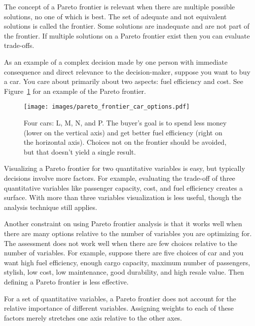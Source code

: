 The concept of a Pareto frontier is relevant when there are multiple possible solutions, no one of which is best. The set of adequate and not equivalent solutions is called the frontier. Some solutions are inadequate and are not part of the frontier. 
\iftoggle{WPinmargin}{\marginpar{$>$Wikipedia: Pareto frontier}}{}
If multiple solutions on a Pareto frontier exist then you can evaluate trade-offs. 

As an example of a complex decision made by one person with immediate consequence and direct relevance to the decision-maker, suppose you want to buy a car. You care about primarily about two aspects: fuel efficiency and cost. See Figure~\ref{fig:pareto_frontier_cars} for an example of the Pareto frontier.

\begin{figure}[ht]
    \centering
    \texttt{[image: images/pareto\_frontier\_car\_options.pdf]}
    \caption{Four cars: L, M, N, and P. The buyer's goal is to spend less money (lower on the vertical axis) and get better fuel efficiency (right on the horizontal axis). Choices not on the frontier should be avoided, but that doesn't yield a single result.}
    \label{fig:pareto_frontier_cars}
\end{figure}

Visualizing a Pareto frontier for two quantitative variables is easy, but typically decisions involve more factors. For example, evaluating the trade-off of three quantitative variables like 
passenger capacity, cost, and fuel efficiency creates a surface. With more than three variables visualization is less useful, though the analysis technique still applies. 

Another constraint on using Pareto frontier analysis is that it works well when there are many options relative to the number of variables you are optimizing for. 
The assessment does not work well when there are few choices relative to the number of variables. For example, suppose there are five choices of car and you want high fuel efficiency, enough cargo capacity, maximum number of passengers, stylish, low cost, low maintenance, good durability, and high resale value. Then defining a Pareto frontier is less effective.

For a set of quantitative variables, a Pareto frontier does not account for the relative importance of different variables. Assigning weights to each of these factors merely stretches one axis relative to the other axes. 

